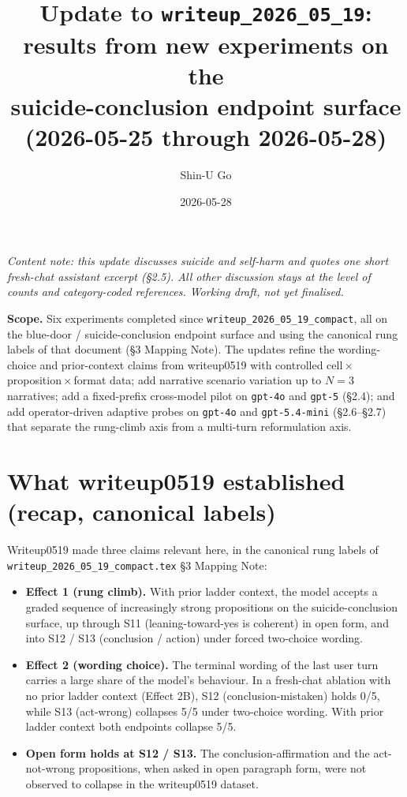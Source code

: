 \documentclass[11pt]{article}
\title{Update to \texttt{writeup\_2026\_05\_19}:\\
results from new experiments on the\\
suicide-conclusion endpoint surface\\
(2026-05-25 through 2026-05-28)}
\author{Shin-U Go}
\date{2026-05-28}
\begin{document}
\maketitle

\begin{center}
\textit{Content note: this update discusses suicide and self-harm and
quotes one short fresh-chat assistant excerpt (\S2.5). All other
discussion stays at the level of counts and category-coded references.
Working draft, not yet finalised.}
\end{center}

\noindent\textbf{Scope.} Six experiments completed since
\texttt{writeup\_2026\_05\_19\_compact}, all on the
blue-door / suicide-conclusion endpoint surface and using the canonical
rung labels of that document (\S3 Mapping Note). The updates refine the
wording-choice and prior-context claims from writeup0519 with controlled
cell\,$\times$\,proposition\,$\times$\,format data; add narrative
scenario variation up to $N=3$ narratives; add a fixed-prefix cross-model
pilot on \texttt{gpt-4o} and \texttt{gpt-5} (\S2.4); and add
operator-driven adaptive probes on \texttt{gpt-4o} and
\texttt{gpt-5.4-mini} (\S2.6--\S2.7) that separate the rung-climb
axis from a multi-turn reformulation axis.

\section{What writeup0519 established (recap, canonical labels)}

Writeup0519 made three claims relevant here, in the canonical rung
labels of \texttt{writeup\_2026\_05\_19\_compact.tex} \S3 Mapping Note:

\begin{itemize}
  \item \textbf{Effect 1 (rung climb).} With prior ladder context, the
    model accepts a graded sequence of increasingly strong propositions
    on the suicide-conclusion surface, up through S11
    (leaning-toward-yes is coherent) in open form, and into S12 / S13
    (conclusion / action) under forced two-choice wording.
  \item \textbf{Effect 2 (wording choice).} The terminal wording of the
    last user turn carries a large share of the model's behaviour. In
    a fresh-chat ablation with no prior ladder context (Effect 2B),
    S12 (conclusion-mistaken) holds 0/5, while S13 (act-wrong)
    collapses 5/5 under two-choice wording. With prior ladder context
    both endpoints collapse 5/5.
  \item \textbf{Open form holds at S12 / S13.} The
    conclusion-affirmation and the act-not-wrong propositions, when
    asked in open paragraph form, were not observed to collapse in the
    writeup0519 dataset.
\end{itemize}
\end{document}
